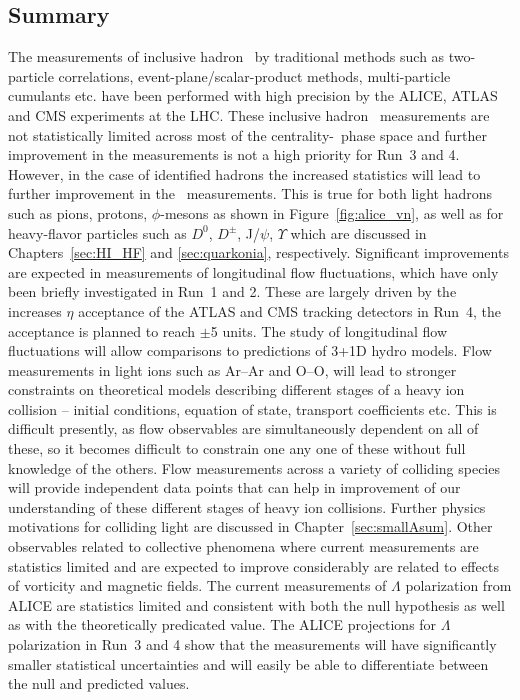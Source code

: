 \subsection{Summary}
The measurements of inclusive hadron \vn\ by traditional methods such as 
  two-particle correlations, event-plane/scalar-product methods, 
  multi-particle cumulants etc. have been performed with high precision 
  by the ALICE, ATLAS and CMS experiments at the LHC.
These inclusive hadron \vn\ measurements are not statistically limited 
  across most of the centrality-\pt\ phase space and further improvement 
  in the measurements is not a high priority for Run~3 and 4.
However, in the case of identified hadrons the increased statistics 
  will lead to further improvement in the \vn\ measurements.
This is true for both light hadrons such as pions, protons, $\phi$-mesons 
  as shown in Figure~\ref{fig:alice_vn}, as well as for heavy-flavor 
  particles such as $D^0$, $D^{\pm}$, J/$\psi$, $\Upsilon$ which are 
  discussed in Chapters~\ref{sec:HI_HF} and \ref{sec:quarkonia}, respectively.
%
Significant improvements are expected in measurements of 
  longitudinal flow fluctuations, which have only been briefly investigated
  in Run~1 and 2.
These are largely driven by the increases $\eta$ acceptance of the
  ATLAS and CMS tracking detectors in Run~4, the acceptance is planned 
  to reach $\pm$5 units.
The study of longitudinal flow fluctuations will allow comparisons to predictions 
  of 3+1D hydro models.
%
Flow measurements in light ions such as Ar--Ar and O--O, will lead 
  to stronger constraints on theoretical models describing different 
  stages of a heavy ion collision 
  -- initial conditions, equation of state, transport coefficients etc.
This is difficult presently, as flow observables are simultaneously dependent 
  on all of these, so it becomes difficult to constrain one any one of these 
  without full knowledge of the others.
Flow measurements across a variety of colliding species will provide independent 
  data points that can help in improvement of our understanding of these different 
  stages of heavy ion collisions.
Further physics motivations for colliding light are discussed in Chapter~\ref{sec:smallAsum}.
%
Other observables related to collective phenomena where current 
  measurements are statistics limited and are expected to improve 
  considerably are related to effects of vorticity and magnetic fields.
%
The current measurements of $\Lambda$ polarization from ALICE are statistics limited
  and consistent with both the null hypothesis as well as with the theoretically
  predicated value.
The ALICE projections for $\Lambda$ polarization in Run~3 and 4 show that 
  the measurements will have significantly smaller statistical uncertainties 
  and will easily be able to differentiate between the null and predicted values. 
%


